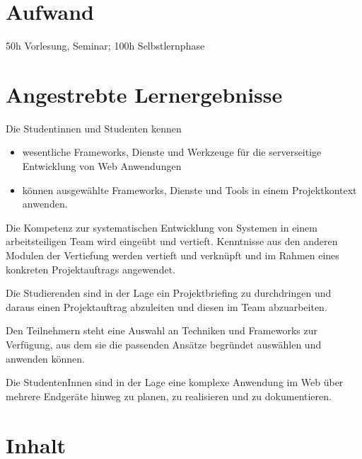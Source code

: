 \hypertarget{aufwandpathlabelmi-2017modulbeschreibungen-bachelorba_wd_frameworks-daten-und-dienste}{%
\section*{Aufwand\label{/mi-2017/modulbeschreibungen-bachelor/BA_WD_Frameworks-daten-und-dienste}}\label{aufwandpathlabelmi-2017modulbeschreibungen-bachelorba_wd_frameworks-daten-und-dienste}}

50h Vorlesung, Seminar; 100h Selbstlernphase

\hypertarget{angestrebte-lernergebnissepathlabelmi-2017modulbeschreibungen-bachelorba_wd_frameworks-daten-und-dienste}{%
\section*{Angestrebte
Lernergebnisse\label{/mi-2017/modulbeschreibungen-bachelor/BA_WD_Frameworks-daten-und-dienste}}\label{angestrebte-lernergebnissepathlabelmi-2017modulbeschreibungen-bachelorba_wd_frameworks-daten-und-dienste}}

Die Studentinnen und Studenten kennen

\begin{itemize}
\tightlist
\item
  wesentliche Frameworks, Dienste und Werkzeuge für die serverseitige
  Entwicklung von Web Anwendungen
\item
  können ausgewählte Frameworks, Dienste und Tools in einem
  Projektkontext anwenden.
\end{itemize}

Die Kompetenz zur systematischen Entwicklung von Systemen in einem
arbeitsteiligen Team wird eingeübt und vertieft. Kenntnisse aus den
anderen Modulen der Vertiefung werden vertieft und verknüpft und im
Rahmen eines konkreten Projektauftrags angewendet.

Die Studierenden sind in der Lage ein Projektbriefing zu durchdringen
und daraus einen Projektauftrag abzuleiten und diesen im Team
abzuarbeiten.

Den Teilnehmern steht eine Auswahl an Techniken und Frameworks zur
Verfügung, aus dem sie die passenden Ansätze begründet auswählen und
anwenden können.

Die StudentenInnen sind in der Lage eine komplexe Anwendung im Web über
mehrere Endgeräte hinweg zu planen, zu realisieren und zu dokumentieren.

\hypertarget{inhaltpathlabelmi-2017modulbeschreibungen-bachelorba_wd_frameworks-daten-und-dienste}{%
\section*{Inhalt\label{/mi-2017/modulbeschreibungen-bachelor/BA_WD_Frameworks-daten-und-dienste}}\label{inhaltpathlabelmi-2017modulbeschreibungen-bachelorba_wd_frameworks-daten-und-dienste}}

